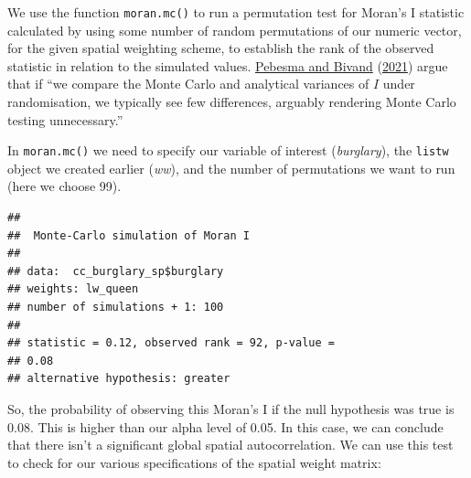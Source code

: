 \documentclass[
  krantz2]{krantz}
\makeatletter
\newenvironment{Shaded}{\begin{snugshade}}{\end{snugshade}}
\newcommand{\AttributeTok}[1]{\textcolor[rgb]{0.61,0.61,0.61}{#1}}
\newcommand{\DecValTok}[1]{\textcolor[rgb]{0.06,0.06,0.06}{#1}}
\newcommand{\FunctionTok}[1]{\textcolor[rgb]{0,0,0}{#1}}
\newcommand{\NormalTok}[1]{#1}
\newcommand{\OtherTok}[1]{\textcolor[rgb]{0.37,0.37,0.37}{#1}}
\newcommand{\SpecialCharTok}[1]{\textcolor[rgb]{0,0,0}{#1}}
\newenvironment{kframe}{%
\medskip{}
\setlength{\fboxsep}{.8em}
 \def\at@end@of@kframe{}%
 \ifinner\ifhmode%
  \def\at@end@of@kframe{\end{minipage}}%
  \begin{minipage}{\columnwidth}%
 \fi\fi%
 \def\FrameCommand##1{\hskip\@totalleftmargin \hskip-\fboxsep
 \colorbox{shadecolor}{##1}\hskip-\fboxsep
     \hskip-\linewidth \hskip-\@totalleftmargin \hskip\columnwidth}%
 \MakeFramed {\advance\hsize-\width
   \@totalleftmargin\z@ \linewidth\hsize
   \@setminipage}}%
 {\par\unskip\endMakeFramed%
 \at@end@of@kframe}
\renewenvironment{Shaded}{\begin{kframe}}{\end{kframe}}
\makeatother
\begin{document}
We use the function \texttt{moran.mc()} to run a permutation test for Moran's I statistic calculated by using some number of random permutations of our numeric vector, for the given spatial weighting scheme, to establish the rank of the observed statistic in relation to the simulated values. \protect\hyperlink{ref-Pebesma_2021}{Pebesma and Bivand} (\protect\hyperlink{ref-Pebesma_2021}{2021}) argue that if ``we compare the Monte Carlo and analytical variances of \(I\) under randomisation, we typically see few differences, arguably rendering Monte Carlo testing unnecessary.''

In \texttt{moran.mc()} we need to specify our variable of interest (\emph{burglary}), the \texttt{listw} object we created earlier (\emph{ww}), and the number of permutations we want to run (here we choose 99).

\begin{Shaded}
\end{Shaded}

\begin{verbatim}
## 
##  Monte-Carlo simulation of Moran I
## 
## data:  cc_burglary_sp$burglary 
## weights: lw_queen  
## number of simulations + 1: 100 
## 
## statistic = 0.12, observed rank = 92, p-value =
## 0.08
## alternative hypothesis: greater
\end{verbatim}

So, the probability of observing this Moran's I if the null hypothesis was true is 0.08. This is higher than our alpha level of 0.05. In this case, we can conclude that there isn't a significant global spatial autocorrelation. We can use this test to check for our various specifications of the spatial weight matrix:

\begin{Shaded}
\end{Shaded}
\end{document}
